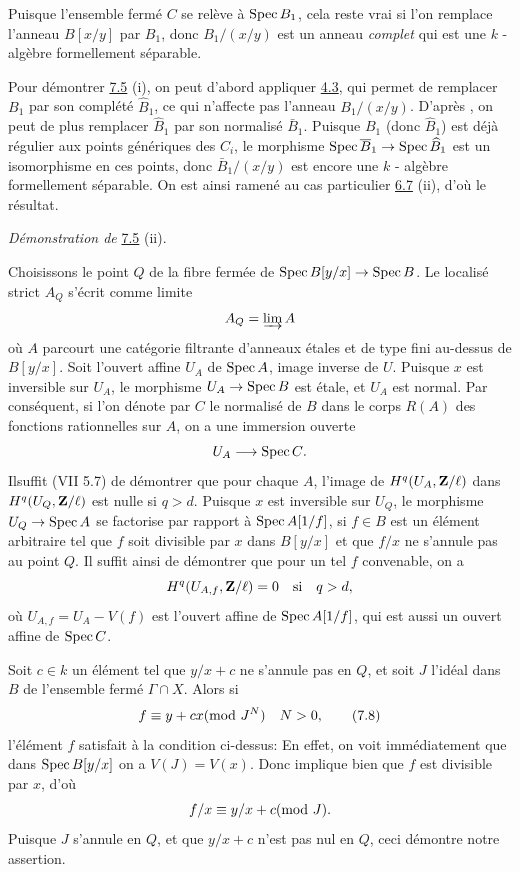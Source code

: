 \documentclass[10pt]{../fichiers-configuration-latex/smfart}
\begin{document}
Puisque l'ensemble fermé $C$ se relève à $\operatorname{Spec} B_{1}$, cela reste
vrai si l'on remplace l'anneau $B[x/y]$ par $B_{1}$, donc
$B_{1}/(x/y)$ est un anneau \emph{complet} qui est une $k$ -algèbre
formellement séparable.

Pour démontrer \hyperref[XIX.lem7.5]{7.5} (i), on peut d'abord appliquer \hyperref[XIX.cor4.3]{4.3}, 
qui permet de
remplacer $B_{1}$ par son complété $\hat{B}_{1}$, ce qui n'affecte pas
l'anneau $B_{1}/(x/y)$. D'après , on peut de plus remplacer
$\hat{B}_{1}$ par son normalisé $\bar{B}_{1}$. Puisque $B_{1}$ (donc
$\hat{B}_{1}$) est déjà régulier aux points génériques des $C_{i}$, le
morphisme $\operatorname{Spec} \overline{B}_{1}\rightarrow \operatorname{Spec} \widehat{B}_{1}$ est un
isomorphisme en ces points, donc $\bar{B}_{1}/(x/y)$ est encore une
$k$ - algèbre formellement séparable. On est ainsi ramené au cas
particulier \hyperref[XIX.lem6.7]{6.7} (ii), d'où le résultat.

\medskip
\noindent
\emph{Démonstration de} \hyperref[XIX.lem7.5]{7.5} (ii).

Choisissons le point $Q$ de la fibre fermée de $\operatorname{Spec}
B[y/x]\rightarrow \operatorname{Spec} B$. Le localisé strict $A_{Q}$ s'écrit comme
limite
$$
A_{Q}=\varinjlim A
$$
où $A$ parcourt une catégorie filtrante d'anneaux étales et de type
fini au-dessus de $B[y/x]$. Soit l'ouvert affine $U_{A}$ de $\operatorname{Spec} A$,
image inverse de $U$. Puisque $x$ est inversible sur $U_{A}$, le
morphisme $U_{A}\rightarrow \operatorname{Spec} B$ est étale, et $U_{A}$ est
normal. Par conséquent, si l'on dénote par $C$ le normalisé de $B$
dans le corps $R(A)$ des fonctions rationnelles sur $A$, on a une
immersion ouverte
$$
U_{A}\longrightarrow \operatorname{Spec} C{}.
$$
Il\pageoriginale suffit (VII 5.7) de démontrer que pour chaque $A$,
l'image de $H^{q}(U_{A},\mathbf{Z}/\ell)$ dans
$H^{q}(U_{Q},\mathbf{Z}/\ell)$ est nulle si $q>d$. Puisque $x$ est
inversible sur $U_{Q}$, le morphisme $U_{Q}\rightarrow \operatorname{Spec} A$ se
factorise par rapport à $\operatorname{Spec} A[1/f]$, si $f\in B$ est un élément
arbitraire tel que $f$ soit divisible par $x$ dans $B[y/x]$ et que
$f/x$ ne s'annule pas au point $Q$. Il suffit ainsi de démontrer que
pour un tel $f$ convenable, on a
$$
H^{q}(U_{A,f},\mathbf{Z}/\ell)=0\quad\text{\rm si}\quad q>d{},
$$
où $U_{A,f}=U_{A}-V(f)$ est l'ouvert affine de $\operatorname{Spec} A[1/f]$, qui est
aussi un ouvert affine de $\operatorname{Spec} C$.

Soit $c\in k$ un élément tel que $y/x+c$ ne s'annule pas en $Q$, et
soit $J$ l'idéal dans $B$ de l'ensemble fermé $\Gamma\cap X$. Alors si
\begin{equation*}
f\equiv y+cx(\text{\rm mod }J^{N})\quad N>0{},\tag{7.8}
\end{equation*}
l'élément $f$ satisfait à la condition ci-dessus: En effet, on voit
immédiatement que dans $\operatorname{Spec} B[y/x]$ on a $V(J)=V(x)$. Donc 
implique bien que $f$ est divisible par $x$, d'où
$$
f/x\equiv y/x+c(\text{\rm mod }J){}.
$$
Puisque $J$ s'annule en $Q$, et que $y/x+c$ n'est pas nul en $Q$, ceci
démontre notre assertion.
\end{document}

